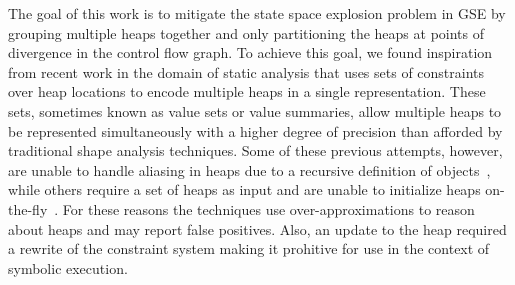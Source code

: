 
The goal of this work is to mitigate the state space explosion problem
in GSE by grouping multiple heaps together and only partitioning the
heaps at points of divergence in the control flow graph. To achieve
this goal, we found inspiration from recent work in the domain of
static analysis that uses sets of constraints over heap locations to
encode multiple heaps in a single representation. These sets,
sometimes known as value sets or value summaries, allow multiple heaps
to be represented simultaneously with a higher degree of precision
than afforded by traditional shape analysis techniques. Some of these
previous attempts, however, are unable to handle aliasing in heaps due
to a recursive definition of objects~\cite{..}, while others require a
set of heaps as input and are unable to initialize heaps
on-the-fly~\cite{..}. For these reasons the techniques use
over-approximations to reason about heaps and may report false
positives. Also, an update to the heap required a rewrite of the
constraint system making it prohitive for use in the context of
symbolic execution.





